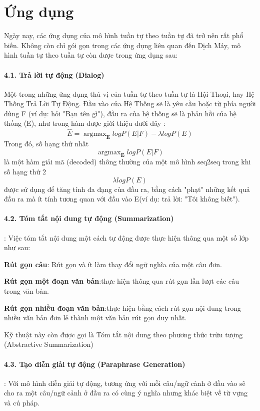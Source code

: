 \section{Ứng dụng}
Ngày nay,  các ứng dụng của mô hình tuần tự theo tuần tự đã trở nên rất phổ biến.  Không còn chỉ gói gọn trong các ứng dụng liên quan đến Dịch Máy,  mô hình tuần tự theo tuần tự còn được trong ứng dụng sau:
\paragraph{4.1.  Trả lời tự động (Dialog)}
Một trong những ứng dụng thú vị của tuần tự theo tuần tự là Hội Thoại, hay Hệ Thống Trả Lời Tự Động. Đầu vào của Hệ Thống sẽ là yêu cầu hoặc từ phía người dùng F (ví dụ: hỏi "Bạn tên gì"), đầu ra của hệ thống sẽ là phản hồi của hệ thống (E), như trong hàm được giới thiệu dưới đây :
$$\hat{E}=\mathop{argmax}_{\textbf{E}} log P(E|F) - \lambda logP(E)$$
Trong đó,  số hạng thứ nhất $$\mathop{argmax}_{\textbf{E}} log P(E|F)$$ là một hàm giải mã (decoded) thông thường của một mô hình seq2seq trong khi số hạng thứ 2  $$\lambda logP(E)$$ được sử dụng để tăng tính đa đạng của đầu ra,  bằng cách "phạt" những kết quả  đầu ra mà ít tính tương quan với đầu vào E(ví dụ: trả lời: "Tôi không biết").

\paragraph{4.2.  Tóm tắt nội dung tự động (Summarization)}:
Việc tóm tắt nội dung một cách tự động được thực hiện thông qua một số lớp như sau:

\textbf{Rút gọn câu}: Rút gọn và ít làm thay đổi ngữ nghĩa của một câu đơn.

\textbf{Rút gọn một đoạn văn bản}:thực hiện thông qua rút gọn lần lượt các câu trong văn bản.

\textbf{Rút gọn nhiều đoạn văn bản}:thực hiện bằng cách rút gọn nội dung trong nhiều văn bản đơn lẻ thành một văn bản rút gọn duy nhất.

Kỹ thuật này còn được gọi là Tóm tắt nội dung theo phương thức trừu tượng (Abstractive Summarization)

\paragraph{4.3. Tạo diễn giải tự động (Paraphrase Generation)}: Với mô hình diễn giải tự động,  tương ứng với mỗi câu/ngữ cảnh ở đầu vào sẽ cho ra một câu/ngữ cảnh ở đầu ra có cùng ý nghĩa nhưng khác biệt về từ vựng và cú pháp.

